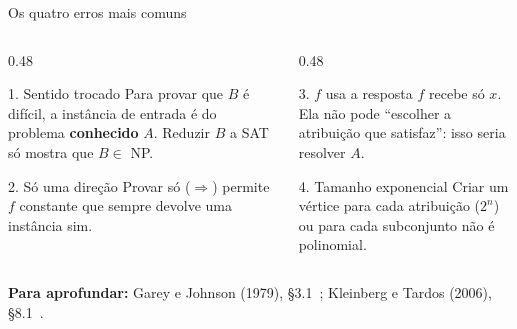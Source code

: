\documentclass[aspectratio=169,xcolor=table]{beamer}
\newcommand{\fonte}[1]{%
  \vfill
  {\tiny\color{gray!55!black}\textbf{Para aprofundar:} #1\par}%
}
\newcommand{\prob}[1]{\textsc{#1}}
\begin{document}
\begin{frame}{Os quatro erros mais comuns}
  \begin{columns}[T]
    \begin{column}{0.48\textwidth}
      \begin{alertblock}{1. Sentido trocado}
        \scriptsize
        Para provar que $B$ é difícil, a instância de entrada é do problema
        \textbf{conhecido} $A$. Reduzir $B$ a \prob{SAT} só mostra que $B \in$ NP.
      \end{alertblock}
      \begin{alertblock}{2. Só uma direção}
        \scriptsize
        Provar só ($\Rightarrow$) permite $f$ constante que sempre devolve uma instância sim.
      \end{alertblock}
    \end{column}
    \begin{column}{0.48\textwidth}
      \begin{alertblock}{3. $f$ usa a resposta}
        \scriptsize
        $f$ recebe só $x$. Ela não pode ``escolher a atribuição que satisfaz'': isso seria
        resolver $A$.
      \end{alertblock}
      \begin{alertblock}{4. Tamanho exponencial}
        \scriptsize
        Criar um vértice para cada atribuição ($2^n$) ou para cada subconjunto não é
        polinomial.
      \end{alertblock}
    \end{column}
  \end{columns}
  \fonte{Garey e Johnson (1979), \S 3.1~\cite{garey1979computers};
    Kleinberg e Tardos (2006), \S 8.1~\cite{kleinberg2006algorithm}.}
\end{frame}
\end{document}
